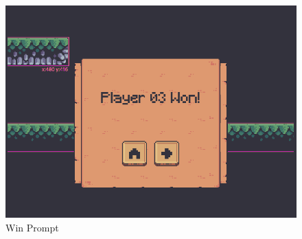 \documentclass[12pt,a4paper,hidelinks]{report}
\begin{document}
\begin{figure}
  \centering
  \includegraphics[width=0.5\linewidth]{assets/win.png}
  \caption{Win Prompt}
  \label{fig:win}
\end{figure}

{}

\end{document}
